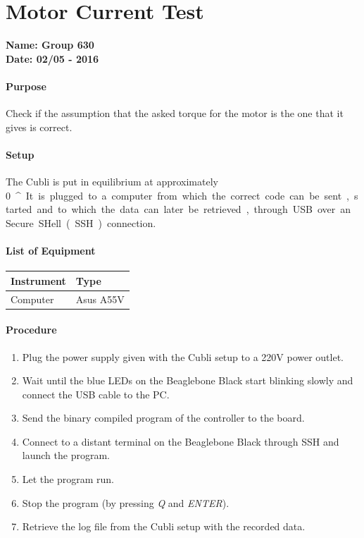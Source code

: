 \chapter{Motor Current Test} \label{app:motorCurrentTest}
\textbf{Name: Group 630}\\
\textbf{Date: 02/05 - 2016}

\subsubsection{Purpose}
Check if the assumption that the asked torque for the motor is the one that it gives is correct.

\subsubsection{Setup}
The Cubli is put in equilibrium at approximately \SI{0}{^{\circ}}. 
It is plugged to a computer from which the correct code can be sent, started and to which the data can later be retrieved, through USB over an Secure SHell (SSH) connection.

\subsubsection{List of Equipment}
\begin{table}[H]
\begin{tabular}{|p{10cm}|p{4cm}|}
\hline%
  \textbf{Instrument}                &  \textbf{Type} \\
\hline%
  Computer                           &  Asus A55V  \\
\hline%
\end{tabular}
\end{table}

\subsubsection{Procedure}

\begin{enumerate}
  \item Plug the power supply given with the Cubli setup to a \si{220}{V} power outlet.
  \item Wait until the blue LEDs on the Beaglebone Black start blinking slowly and connect the USB cable to the PC.
  \item Send the binary compiled program of the controller to the board.
  \item Connect to a distant terminal on the Beaglebone Black through SSH and launch the program.
  \item Let the program run.
  \item Stop the program (by pressing \textit{Q} and \textit{ENTER}).
  \item Retrieve the log file from the Cubli setup with the recorded data.
\end{enumerate}

